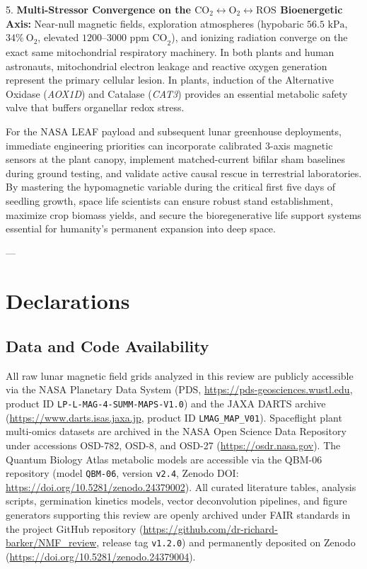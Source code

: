 \documentclass[default,sn-nature,iicol]{sn-jnl}
\begin{document}
5. \textbf{Multi-Stressor Convergence on the $\text{CO}_2 \leftrightarrow \text{O}_2 \leftrightarrow \text{ROS}$ Bioenergetic Axis:} Near-null magnetic fields, exploration atmospheres (hypobaric $56.5\text{ kPa}$, $34\%\ \text{O}_2$, elevated $1200\text{--}3000\text{ ppm CO}_2$), and ionizing radiation converge on the exact same mitochondrial respiratory machinery. In both plants and human astronauts, mitochondrial electron leakage and reactive oxygen generation represent the primary cellular lesion. In plants, induction of the Alternative Oxidase (\textit{AOX1D}) and Catalase (\textit{CAT3}) provides an essential metabolic safety valve that buffers organellar redox stress.

For the NASA LEAF payload and subsequent lunar greenhouse deployments, immediate engineering priorities can incorporate calibrated 3-axis magnetic sensors at the plant canopy, implement matched-current bifilar sham baselines during ground testing, and validate active causal rescue in terrestrial laboratories. By mastering the hypomagnetic variable during the critical first five days of seedling growth, space life scientists can ensure robust stand establishment, maximize crop biomass yields, and secure the bioregenerative life support systems essential for humanity's permanent expansion into deep space.

---



\section*{Declarations}

\subsection*{Data and Code Availability}
All raw lunar magnetic field grids analyzed in this review are publicly accessible via the NASA Planetary Data System (PDS, \url{https://pds-geosciences.wustl.edu}, product ID \texttt{LP-L-MAG-4-SUMM-MAPS-V1.0}) and the JAXA DARTS archive (\url{https://www.darts.isas.jaxa.jp}, product ID \texttt{LMAG\_MAP\_V01}). Spaceflight plant multi-omics datasets are archived in the NASA Open Science Data Repository under accessions OSD-782, OSD-8, and OSD-27 (\url{https://osdr.nasa.gov}). The Quantum Biology Atlas metabolic models are accessible via the QBM-06 repository (model \texttt{QBM-06}, version \texttt{v2.4}, Zenodo DOI: \url{https://doi.org/10.5281/zenodo.24379002}). All curated literature tables, analysis scripts, germination kinetics models, vector deconvolution pipelines, and figure generators supporting this review are openly archived under FAIR standards in the project GitHub repository (\url{https://github.com/dr-richard-barker/NMF_review}, release tag \texttt{v1.2.0}) and permanently deposited on Zenodo (\url{https://doi.org/10.5281/zenodo.24379004}).
\end{document}
